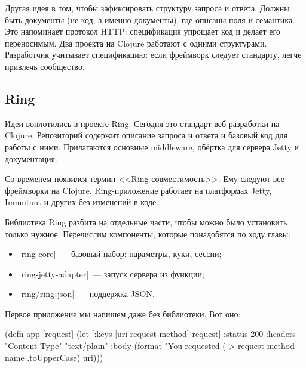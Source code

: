 Другая идея в том, чтобы зафиксировать структуру запроса и ответа. Должны быть
документы (не код, а именно документы), где описаны поля и семантика. Это
напоминает протокол HTTP: спецификация упрощает код и делает его
переносимым. Два проекта на Clojure работают с одними структурами. Разработчик
учитывает спецификацию: если фреймворк следует стандарту, легче привлечь
сообщество.

\subsection{Ring}


\label{ring-jetty}

Идеи воплотились в проекте Ring.
Сегодня это стандарт веб-разработки на Clojure. Репозиторий содержит описание
запроса и ответа и базовый код для работы с ними. Прилагаются основные middleware,
об\"{е}ртка для сервера Jetty и документация.


Со временем появился термин <<Ring-совместимость>>. Ему следуют все фреймворки
на Clojure. Ring-приложение работает на платформах Jetty, Immutant и других без
изменений в коде.

Библиотека Ring разбита на отдельные части, чтобы можно было установить только
нужное. Перечислим компоненты, которые понадобятся по ходу главы:

\begin{itemize}

\item
  \spverb|ring-core|~--- базовый набор: параметры, куки, сессии;

\item
  \spverb|ring-jetty-adapter|~--- запуск сервера из функции;

\item
  \spverb|ring/ring-json|~--- поддержка JSON.

\end{itemize}

Первое приложение мы напишем даже без библиотеки. Вот оно:


\label{first-handler}

\begin{english}
  \begin{clojure}
(defn app [request]
  (let [{:keys [uri request-method]} request]
    {:status 200
     :headers {"Content-Type" "text/plain"}
     :body (format "You requested %
                   (-> request-method name .toUpperCase)
                   uri)}))
  \end{clojure}
\end{english}

